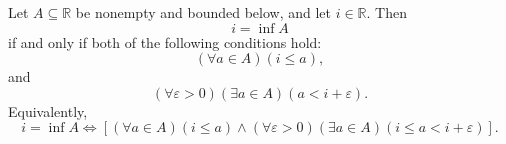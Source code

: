 \begin{definition}
\label{def:epsilon-characterization-of-infimum}
Let $A\subseteq\mathbb{R}$ be nonempty and bounded below, and let
$i\in\mathbb{R}$. Then
\[
  i=\inf A
\]
if and only if both of the following conditions hold:
\[
  (\forall a\in A)(i\leq a),
\]
and
\[
  (\forall\varepsilon>0)(\exists a\in A)(a<i+\varepsilon).
\]
Equivalently,
\[
  i=\inf A
  \Longleftrightarrow
  \left[
    (\forall a\in A)(i\leq a)
    \land
    (\forall\varepsilon>0)(\exists a\in A)(i\leq a<i+\varepsilon)
  \right].
\]
\end{definition}
